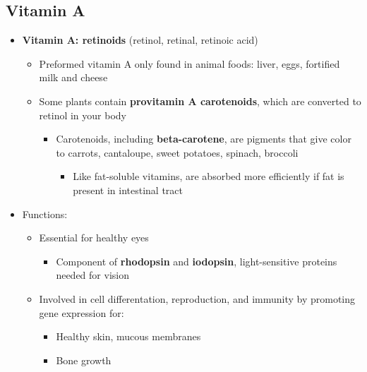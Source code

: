 \documentclass[12pt]{article}
\begin{document}
        \subsection{Vitamin A}
            \begin{itemize}
                \item \textbf{Vitamin A: retinoids} (retinol, retinal, retinoic acid)
                    \begin{itemize}
                        \item Preformed vitamin A only found in animal foods: liver, eggs, fortified milk and cheese
                        \item Some plants contain \textbf{provitamin A carotenoids}, which are converted to retinol in your body
                            \begin{itemize}
                                \item Carotenoids, including \textbf{beta-carotene}, are pigments that give color to carrots, cantaloupe, sweet potatoes, spinach, broccoli
                                    \begin{itemize}
                                        \item Like fat-soluble vitamins, are absorbed more efficiently if fat is present in intestinal tract
                                    \end{itemize}
                            \end{itemize}
                    \end{itemize}
                \item Functions:
                    \begin{itemize}
                        \item Essential for healthy eyes
                            \begin{itemize}
                                \item Component of \textbf{rhodopsin} and \textbf{iodopsin}, light-sensitive proteins needed for vision
                            \end{itemize}
                        \item Involved in cell differentation, reproduction, and immunity by promoting gene expression for:
                            \begin{itemize}
                                \item Healthy skin, mucous membranes
                                \item Bone growth

\end{itemize}
\end{itemize}
\end{itemize}
\end{document}
